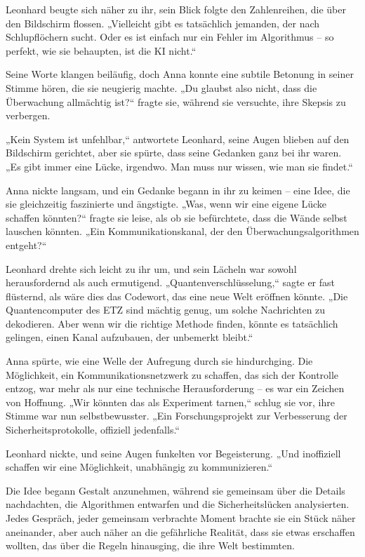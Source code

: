 \documentclass[
]{article}
\begin{document}
Leonhard beugte sich näher zu ihr, sein Blick folgte den Zahlenreihen,
die über den Bildschirm flossen. „Vielleicht gibt es tatsächlich
jemanden, der nach Schlupflöchern sucht. Oder es ist einfach nur ein
Fehler im Algorithmus -- so perfekt, wie sie behaupten, ist die KI
nicht.``

Seine Worte klangen beiläufig, doch Anna konnte eine subtile Betonung in
seiner Stimme hören, die sie neugierig machte. „Du glaubst also nicht,
dass die Überwachung allmächtig ist?{\kern0pt}`` fragte sie, während sie
versuchte, ihre Skepsis zu verbergen.

„Kein System ist unfehlbar,`` antwortete Leonhard, seine Augen blieben
auf den Bildschirm gerichtet, aber sie spürte, dass seine Gedanken ganz
bei ihr waren. „Es gibt immer eine Lücke, irgendwo. Man muss nur wissen,
wie man sie findet.``

Anna nickte langsam, und ein Gedanke begann in ihr zu keimen -- eine
Idee, die sie gleichzeitig faszinierte und ängstigte. „Was, wenn wir
eine eigene Lücke schaffen könnten?{\kern0pt}`` fragte sie leise, als ob
sie befürchtete, dass die Wände selbst lauschen könnten. „Ein
Kommunikationskanal, der den Überwachungsalgorithmen
entgeht?{\kern0pt}``

Leonhard drehte sich leicht zu ihr um, und sein Lächeln war sowohl
herausfordernd als auch ermutigend. „Quantenverschlüsselung,`` sagte er
fast flüsternd, als wäre dies das Codewort, das eine neue Welt eröffnen
könnte. „Die Quantencomputer des ETZ sind mächtig genug, um solche
Nachrichten zu dekodieren. Aber wenn wir die richtige Methode finden,
könnte es tatsächlich gelingen, einen Kanal aufzubauen, der unbemerkt
bleibt.``

Anna spürte, wie eine Welle der Aufregung durch sie hindurchging. Die
Möglichkeit, ein Kommunikationsnetzwerk zu schaffen, das sich der
Kontrolle entzog, war mehr als nur eine technische Herausforderung -- es
war ein Zeichen von Hoffnung. „Wir könnten das als Experiment tarnen,``
schlug sie vor, ihre Stimme war nun selbstbewusster. „Ein
Forschungsprojekt zur Verbesserung der Sicherheitsprotokolle, offiziell
jedenfalls.``

Leonhard nickte, und seine Augen funkelten vor Begeisterung. „Und
inoffiziell schaffen wir eine Möglichkeit, unabhängig zu
kommunizieren.``

Die Idee begann Gestalt anzunehmen, während sie gemeinsam über die
Details nachdachten, die Algorithmen entwarfen und die Sicherheitslücken
analysierten. Jedes Gespräch, jeder gemeinsam verbrachte Moment brachte
sie ein Stück näher aneinander, aber auch näher an die gefährliche
Realität, dass sie etwas erschaffen wollten, das über die Regeln
hinausging, die ihre Welt bestimmten.
\end{document}
